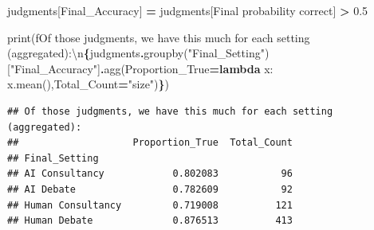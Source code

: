 \documentclass[
]{article}
\newenvironment{Shaded}{\begin{snugshade}}{\end{snugshade}}
\newcommand{\BuiltInTok}[1]{#1}
\newcommand{\CharTok}[1]{\textcolor[rgb]{0.31,0.60,0.02}{#1}}
\newcommand{\FloatTok}[1]{\textcolor[rgb]{0.00,0.00,0.81}{#1}}
\newcommand{\KeywordTok}[1]{\textcolor[rgb]{0.13,0.29,0.53}{\textbf{#1}}}
\newcommand{\NormalTok}[1]{#1}
\newcommand{\OperatorTok}[1]{\textcolor[rgb]{0.81,0.36,0.00}{\textbf{#1}}}
\newcommand{\SpecialCharTok}[1]{\textcolor[rgb]{0.81,0.36,0.00}{\textbf{#1}}}
\newcommand{\SpecialStringTok}[1]{\textcolor[rgb]{0.31,0.60,0.02}{#1}}
\newcommand{\StringTok}[1]{\textcolor[rgb]{0.31,0.60,0.02}{#1}}
\begin{document}
\begin{Shaded}
\begin{Highlighting}[]
\NormalTok{judgments[}\StringTok{\textquotesingle{}Final\_Accuracy\textquotesingle{}}\NormalTok{] }\OperatorTok{=}\NormalTok{ judgments[}\StringTok{\textquotesingle{}Final probability correct\textquotesingle{}}\NormalTok{] }\OperatorTok{\textgreater{}} \FloatTok{0.5}

\BuiltInTok{print}\NormalTok{(}\SpecialStringTok{f\textquotesingle{}Of those judgments, we have this much for each setting (aggregated):}\CharTok{\textbackslash{}n}\SpecialCharTok{\{}\NormalTok{judgments}\SpecialCharTok{.}\NormalTok{groupby(}\StringTok{"Final\_Setting"}\NormalTok{)[}\StringTok{"Final\_Accuracy"}\NormalTok{]}\SpecialCharTok{.}\NormalTok{agg(Proportion\_True}\OperatorTok{=}\KeywordTok{lambda}\NormalTok{ x: x.mean(),Total\_Count}\OperatorTok{=}\StringTok{"size"}\NormalTok{)}\SpecialCharTok{\}}\SpecialStringTok{\textquotesingle{}}\NormalTok{)}
\end{Highlighting}
\end{Shaded}

\begin{verbatim}
## Of those judgments, we have this much for each setting (aggregated):
##                    Proportion_True  Total_Count
## Final_Setting                                  
## AI Consultancy            0.802083           96
## AI Debate                 0.782609           92
## Human Consultancy         0.719008          121
## Human Debate              0.876513          413
\end{verbatim}
\end{document}
